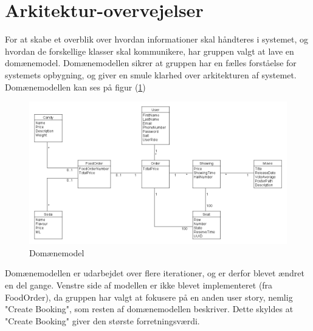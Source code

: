 \section{Arkitektur-overvejelser}\label{sec:arkitektur}
For at skabe et overblik over hvordan informationer skal håndteres i systemet,
og hvordan de forskellige klasser skal kommunikere, har gruppen valgt at lave en domænemodel.
Domænemodellen sikrer at gruppen har en fælles forståelse for systemets opbygning,
og giver en smule klarhed over arkitekturen af systemet.\\

Domænemodellen kan ses på figur (\ref{fig:domain})

\begin{figure}[H]
    \centering
    \includegraphics[width=1\textwidth]{figures/Domainmodel.png}
    \caption{Domænemodel}
    \label{fig:domain}
\end{figure}

Domænemodellen er udarbejdet over flere iterationer, og er derfor blevet ændret en del gange.
Venstre side af modellen er ikke blevet implementeret (fra FoodOrder), da gruppen har valgt at fokusere på
en anden user story, nemlig "Create Booking", som resten af domænemodellen beskriver. Dette skyldes at "Create Booking"
giver den største forretningsværdi.

